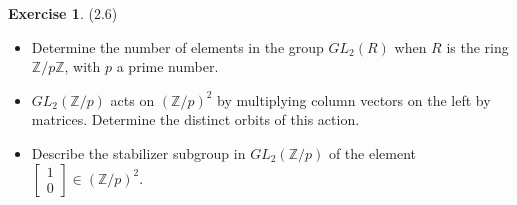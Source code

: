 \documentclass[12pt, psamsfonts]{amsart}
\theoremstyle{definition}
\newtheorem*{exer}{Exercise}
\theoremstyle{remark}
\numberwithin{equation}{section}
\begin{document}
\begin{exer}{(2.6)}
  $ $
  \begin{itemize}
    \item
      Determine the number of elements in the group $GL_2(R)$ when $R$ is the ring $\mathbb{Z} / p\mathbb{Z}$, with $p$ a prime number.
    \item
      $GL_2(\mathbb{Z} / p)$ acts on $(\mathbb{Z} / p)^2$ by multiplying column vectors on the left by matrices.
      Determine the distinct orbits of this action.
    \item
      Describe the stabilizer subgroup in $GL_2(\mathbb{Z} / p)$ of the element $\begin{bmatrix} 1 \\ 0 \end{bmatrix} \in (\mathbb{Z} / p)^2$.
  \end{itemize}
\end{exer}
\end{document}
